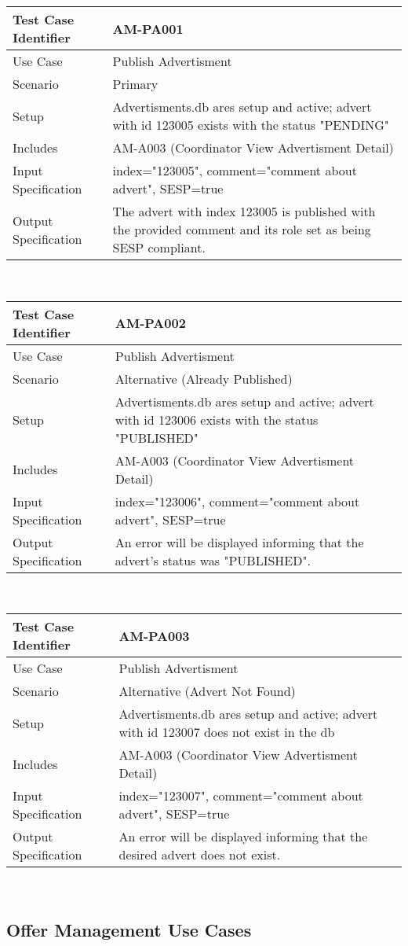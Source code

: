 \documentclass{l3deliverable}
\begin{document}
\begin{tabular}{lp{10cm}}
\hline 
\textbf{Test Case Identifier} & AM-PA001\tabularnewline
\hline 
\hline 
Use Case & Publish Advertisment \tabularnewline
\hline 
Scenario & Primary \tabularnewline
\hline 
Setup & Advertisments.db ares setup and active; advert with id 123005 exists with the status "PENDING"\tabularnewline
\hline 
Includes & AM-A003 (Coordinator View Advertisment Detail)\tabularnewline
\hline 
Input Specification & index="123005", comment="comment about advert", SESP=true \tabularnewline
\hline 
Output Specification &The advert with index 123005 is published with the provided comment and its role set as being SESP compliant.\tabularnewline
\hline 
\end{tabular}\\

\begin{tabular}{lp{10cm}}
\hline 
\textbf{Test Case Identifier} & AM-PA002\tabularnewline
\hline 
\hline 
Use Case & Publish Advertisment \tabularnewline
\hline 
Scenario & Alternative (Already Published) \tabularnewline
\hline 
Setup & Advertisments.db ares setup and active; advert with id 123006 exists with the status "PUBLISHED"\tabularnewline
\hline 
Includes & AM-A003 (Coordinator View Advertisment Detail)\tabularnewline
\hline 
Input Specification & index="123006", comment="comment about advert", SESP=true \tabularnewline
\hline 
Output Specification & An error will be displayed informing that the advert's status was "PUBLISHED".\tabularnewline
\hline 
\end{tabular}\\


\begin{tabular}{lp{10cm}}
\hline 
\textbf{Test Case Identifier} & AM-PA003\tabularnewline
\hline 
\hline 
Use Case & Publish Advertisment \tabularnewline
\hline 
Scenario & Alternative (Advert Not Found) \tabularnewline
\hline 
Setup & Advertisments.db ares setup and active; advert with id 123007 does not exist in the db\tabularnewline
\hline 
Includes & AM-A003 (Coordinator View Advertisment Detail)\tabularnewline
\hline 
Input Specification & index="123007", comment="comment about advert", SESP=true \tabularnewline
\hline 
Output Specification & An error will be displayed informing that the desired advert does not exist.\tabularnewline
\hline 
\end{tabular}\\

\subsection{Offer Management Use Cases}
\end{document}
